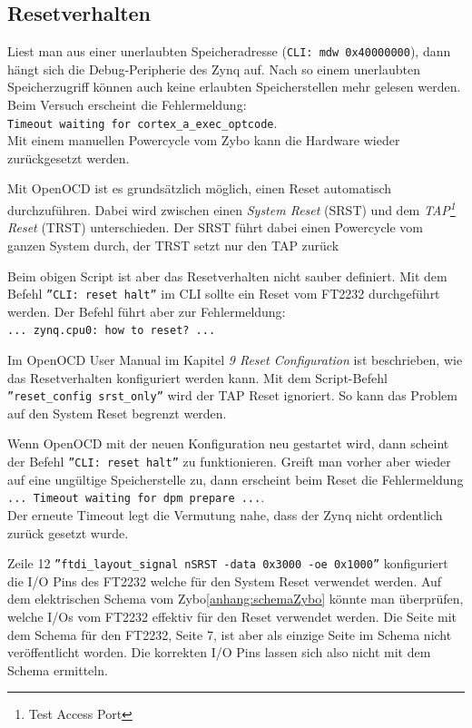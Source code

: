 \subsection{Resetverhalten}
Liest man aus einer unerlaubten Speicheradresse (\texttt{CLI: mdw 0x40000000}), dann hängt sich die Debug-Peripherie des Zynq auf.
Nach so einem unerlaubten Speicherzugriff können auch keine erlaubten Speicherstellen mehr gelesen werden.
Beim Versuch erscheint die Fehlermeldung:\\
 \texttt{Timeout waiting for cortex\_a\_exec\_optcode}.\\
Mit einem manuellen Powercycle vom Zybo kann die Hardware wieder zurückgesetzt werden.

Mit OpenOCD ist es grundsätzlich möglich, einen Reset automatisch durchzuführen.
Dabei wird zwischen einen \textit{System Reset} (SRST) und dem \textit{TAP\footnote{Test Access Port} Reset} (TRST) unterschieden.
Der SRST führt dabei einen Powercycle vom ganzen System durch, der TRST setzt nur den TAP zurück

Beim obigen Script ist aber das Resetverhalten nicht sauber definiert.
Mit dem Befehl \texttt{''CLI: reset halt''} im CLI sollte ein Reset vom FT2232 durchgeführt werden.
Der Befehl führt aber zur Fehlermeldung:\\
\texttt{... zynq.cpu0: how to reset? ...}

Im OpenOCD User Manual\cite{bib:OpenOCDDoku} im Kapitel \textit{9 Reset Configuration} ist beschrieben, wie das Resetverhalten konfiguriert werden kann.
Mit dem Script-Befehl \texttt{''reset\_config srst\_only''} wird der TAP Reset ignoriert.
So kann das Problem auf den System Reset begrenzt werden.

Wenn OpenOCD mit der neuen Konfiguration neu gestartet wird, dann scheint der Befehl \texttt{''CLI: reset halt''} zu funktionieren.
Greift man vorher aber wieder auf eine ungültige Speicherstelle zu, dann erscheint beim Reset die Fehlermeldung\\
\texttt{... Timeout waiting for dpm prepare ...}.\\
Der erneute Timeout legt die Vermutung nahe, dass der Zynq nicht ordentlich zurück gesetzt wurde.

Zeile 12 \texttt{''ftdi\_layout\_signal nSRST -data 0x3000 -oe 0x1000''} konfiguriert die I/O Pins des FT2232 welche für den System Reset verwendet werden.
Auf dem elektrischen Schema vom Zybo\ref{anhang:schemaZybo} könnte man überprüfen, welche I/Os vom FT2232 effektiv für den Reset verwendet werden.
Die Seite mit dem Schema für den FT2232, Seite 7, ist aber als einzige Seite im Schema nicht veröffentlicht worden.
Die korrekten I/O Pins lassen sich also nicht mit dem Schema ermitteln.

